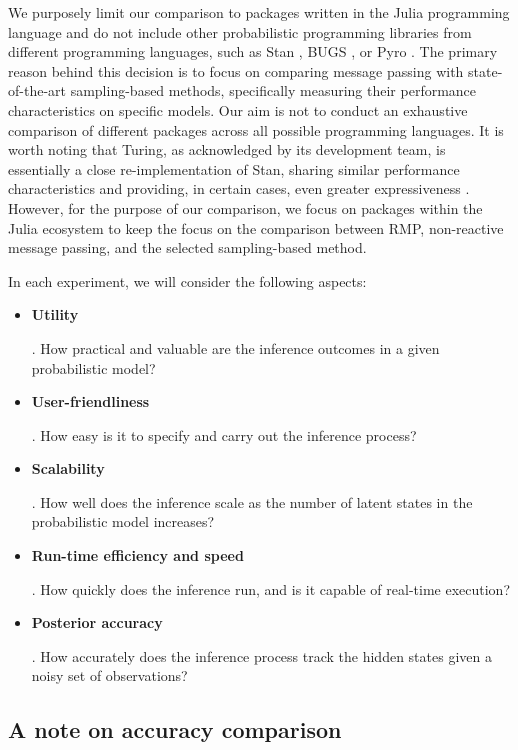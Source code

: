 We purposely limit our comparison to packages written in the Julia programming language and do
not include other probabilistic programming libraries from different programming languages,
such as Stan \citep{carpenter_stan:_2017}, BUGS \citep{lunn_bugs_2009}, or Pyro \citep{bingham_pyro_2019}.
The primary reason behind this decision is to focus on comparing message passing with
state-of-the-art sampling-based methods, specifically measuring their performance
characteristics on specific models.
Our aim is not to conduct an exhaustive comparison of different packages across all possible programming languages.
It is worth noting that Turing, as acknowledged by its development team, is essentially a
close re-implementation of Stan, sharing similar performance characteristics and providing, in
certain cases, even greater expressiveness \citep{ge_turing_2018}.
However, for the purpose of our comparison, we focus on packages within the Julia ecosystem to keep the focus on the comparison between RMP, non-reactive message passing, and the selected
sampling-based method.

In each experiment, we will consider the following aspects:
\begin{itemize}
    \item \hypertarget{experiments:utility}{\textbf{Utility}}. How practical and valuable are the inference outcomes in a given probabilistic model?
    \item \hypertarget{experiments:userfriendliness}{\textbf{User-friendliness}}. How easy is it to specify and carry out the inference process?
    \item \hypertarget{experiments:scalability}{\textbf{Scalability}}. How well does the inference scale as the number of latent states in the probabilistic model increases?
    \item \hypertarget{experiments:efficiency}{\textbf{Run-time efficiency and speed}}. How quickly does the inference run, and is it capable of real-time execution?
    \item \hypertarget{experiments:accuracy}{\textbf{Posterior accuracy}}. How accurately does the inference process track the hidden states given a noisy set of observations?
\end{itemize}

\subsection{A note on accuracy comparison}

